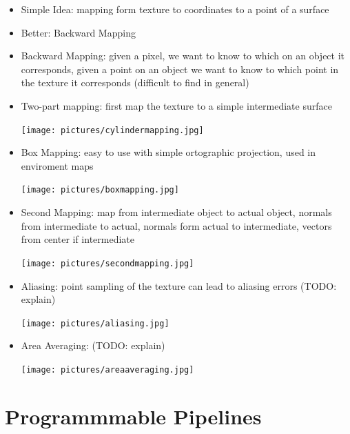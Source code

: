 \documentclass[11pt,a4paper]{article}
\begin{document}
\begin{itemize}
		\item Simple Idea: mapping form texture to coordinates to a point of a surface
		\item Better: Backward Mapping
		\item Backward Mapping: given a pixel, we want to know to which on an object it corresponds, given a point on an object we want to know to which point in the texture it corresponds (difficult to find in general)
		\item Two-part mapping: first map the texture to a simple intermediate surface
		\begin{center}
			\texttt{[image: pictures/cylindermapping.jpg]}
		\end{center}
		\item Box Mapping: easy to use with simple ortographic projection, used in enviroment maps
		\begin{center}
			\texttt{[image: pictures/boxmapping.jpg]}
		\end{center}
		\item Second Mapping: map from intermediate object to actual object, normals from intermediate to actual, normals form actual to intermediate, vectors from center if intermediate
		\begin{center}
			\texttt{[image: pictures/secondmapping.jpg]}
		\end{center}
		\item Aliasing: point sampling of the texture can lead to aliasing errors (TODO: explain)
		\begin{center}
			\texttt{[image: pictures/aliasing.jpg]}
		\end{center}
		\item Area Averaging: (TODO: explain)
		\begin{center}
			\texttt{[image: pictures/areaaveraging.jpg]}
		\end{center}
	\end{itemize}

\section{Programmmable Pipelines}
\end{document}
